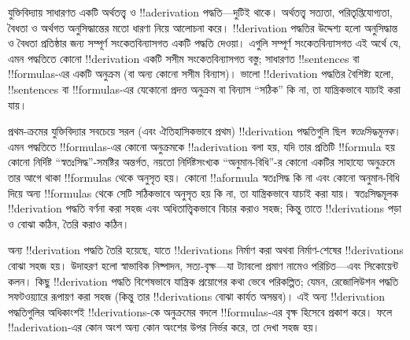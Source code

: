 \documentclass[../../../include/open-logic-section]{subfiles}
\begin{document}
      {}
      {}


যুক্তিবিদ্যায় সাধারণত একটি অর্থতত্ত্ব ও !!a{derivation}
পদ্ধতি—দুটিই থাকে। অর্থতত্ত্ব সত্যতা, পরিতৃপ্তিযোগ্যতা, বৈধতা ও
অর্থগত অনুসিদ্ধান্তের মতো ধারণা নিয়ে আলোচনা করে। !!{derivation}
পদ্ধতির উদ্দেশ্য হলো অনুসিদ্ধান্ত ও বৈধতা প্রতিষ্ঠার জন্য সম্পূর্ণ
সংকেতবিন্যাসগত একটি পদ্ধতি দেওয়া। এগুলি সম্পূর্ণ সংকেতবিন্যাসগত এই অর্থে
যে, এমন পদ্ধতিতে কোনো !!{derivation} একটি সসীম সংকেতবিন্যাসগত বস্তু;
সাধারণত !!{sentence}s বা !!{formula}s-এর একটি অনুক্রম (বা অন্য কোনো
সসীম বিন্যাস)। ভালো !!{derivation} পদ্ধতির বৈশিষ্ট্য হলো, !!{sentence}s
বা !!{formula}s-এর যেকোনো প্রদত্ত অনুক্রম বা বিন্যাস “সঠিক” কি না,
তা যান্ত্রিকভাবে যাচাই করা যায়।

প্রথম-ক্রমের যুক্তিবিদ্যার সবচেয়ে সরল (এবং ঐতিহাসিকভাবে প্রথম)
!!{derivation} পদ্ধতিগুলি ছিল \emph{স্বতঃসিদ্ধমূলক}। এমন পদ্ধতিতে
!!{formula}s-এর কোনো অনুক্রমকে !!a{derivation} বলা হয়, যদি তার
প্রতিটি !!{formula} হয় কোনো নির্দিষ্ট “স্বতঃসিদ্ধ”-সমষ্টির অন্তর্গত,
নয়তো নির্দিষ্টসংখ্যক “অনুমান-বিধি”-র কোনো একটির সাহায্যে অনুক্রমে তার
আগে থাকা !!{formula}s থেকে অনুসৃত হয়। কোনো !!a{formula} স্বতঃসিদ্ধ কি
না এবং কোনো অনুমান-বিধি দিয়ে অন্য !!{formula}s থেকে সেটি সঠিকভাবে
অনুসৃত হয় কি না, তা যান্ত্রিকভাবে যাচাই করা যায়। স্বতঃসিদ্ধমূলক
!!{derivation} পদ্ধতি বর্ণনা করা সহজ এবং অধিতাত্ত্বিকভাবে বিচার করাও
সহজ; কিন্তু তাতে !!{derivation}s পড়া ও বোঝা কঠিন, তৈরি করাও কঠিন।

অন্য !!{derivation} পদ্ধতি তৈরি হয়েছে, যাতে !!{derivation}s নির্মাণ
করা অথবা নির্মাণ-শেষের !!{derivation}s বোঝা সহজ হয়। উদাহরণ হলো স্বাভাবিক
নিষ্পাদন, সত্য-বৃক্ষ—যা ট্যাবলো প্রমাণ নামেও পরিচিত—এবং সিকোয়েন্ট কলন।
কিছু !!{derivation} পদ্ধতি বিশেষভাবে যান্ত্রিক প্রয়োগের কথা ভেবে
পরিকল্পিত; যেমন, রেজোলিউশন পদ্ধতি সফটওয়্যারে রূপায়ণ করা সহজ (কিন্তু তার
!!{derivation}s বোঝা কার্যত অসম্ভব)। এই অন্য !!{derivation} পদ্ধতিগুলির অধিকাংশই
!!{derivation}s-কে অনুক্রমের বদলে !!{formula}s-এর বৃক্ষ হিসেবে প্রকাশ
করে। ফলে !!a{derivation}-এর কোন অংশ অন্য কোন অংশের উপর নির্ভর করে,
তা দেখা সহজ হয়।
\end{document}
